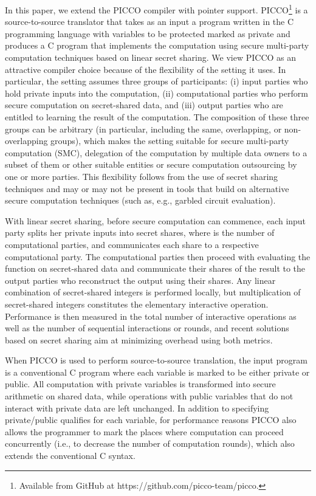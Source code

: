 \documentclass[11pt]{article}
\begin{document}
In this paper, we extend the PICCO compiler \cite{zha13} with pointer
support. PICCO\footnote{Available from GitHub at
https://github.com/picco-team/picco.} is a source-to-source translator that
takes as an input a program written in the C programming language with
variables to be protected marked as private and produces a C program that
implements the computation using secure multi-party computation techniques
based on linear secret sharing. We view PICCO as an attractive compiler
choice because of the flexibility of the setting it uses. In particular, the
setting assumes three groups of participants: (i) input parties who hold
private inputs into the computation, (ii) computational parties who perform
secure computation on secret-shared data, and (iii) output parties who are
entitled to learning the result of the computation. The composition of these
three groups can be arbitrary (in particular, including the same,
overlapping, or non-overlapping groups), which makes the setting suitable
for secure multi-party computation (SMC), delegation of the computation by
multiple data owners to a subset of them or other suitable entities or
secure computation outsourcing by one or more parties. This flexibility
follows from the use of secret sharing techniques and may or may not be
present in tools that build on alternative secure computation techniques
(such as, e.g., garbled circuit evaluation).

With linear secret sharing, before secure computation can commence, each
input party splits her private inputs into  secret shares, where 
is the number of computational parties, and communicates each share to a
respective computational party. The computational parties then proceed with
evaluating the function on secret-shared data and communicate their shares
of the result to the output parties who reconstruct the output using their
shares. Any linear combination of secret-shared integers is performed
locally, but multiplication of secret-shared integers constitutes the
elementary interactive operation. Performance is then measured in the total
number of interactive operations as well as the number of sequential
interactions or rounds, and recent solutions based on secret sharing aim at
minimizing overhead using both metrics.

When PICCO is used to perform source-to-source translation, the input
program is a conventional C program where each variable is marked to be
either private or public. All computation with private variables is
transformed into secure arithmetic on shared data, while operations with
public variables that do not interact with private data are left unchanged.
In addition to specifying private/public qualifies for each variable, for
performance reasons PICCO also allows the programmer to mark the places
where computation can proceed concurrently (i.e., to decrease the number of
computation rounds), which also extends the conventional C syntax. 
\end{document}
